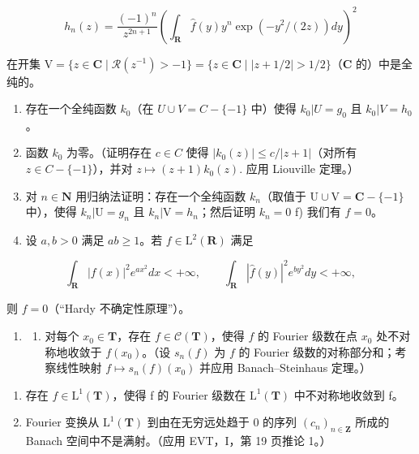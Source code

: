 \[
h _ {n} (z) = \frac {(- 1) ^ {n}}{z ^ {2 n + 1}} \left(\int_ {\mathbf {R}} \widehat {f} (y) y ^ {n} \exp (- y ^ {2} / (2 z)) d y\right) ^ {2}
\]

在开集 \(\mathrm{V} = \{z \in \mathbf{C} \mid \mathcal{R}(z^{-1}) > -1\} = \{z \in \mathbf{C} \mid |z + 1/2| > 1/2\}\)（\(\mathbf{C}\) 的）中是全纯的。

\begin{enumerate}
\def\labelenumi{\alph{enumi})}
\setcounter{enumi}{2}
\item
存在一个全纯函数 \(k_{0}\)（在 \(U \cup V = C - \{-1\}\) 中）使得 \(k_{0}|U = g_{0}\) 且 \(k_{0}|V = h_{0}\)。
\item
  函数 \(k_{0}\) 为零。（证明存在 \(c \in C\) 使得 \(|k_{0}(z)| \leqslant c/|z+1|\)（对所有 \(z \in C - \{-1\}\)），并对 \(z \mapsto (z+1)k_{0}(z).\) 应用 Liouville 定理。）
\item
    对 \(n \in \mathbf{N}\) 用归纳法证明：存在一个全纯函数 \(k_n\)（取值于 \(\mathrm{U} \cup \mathrm{V} = \mathbf{C} - \{-1\}\) 中），使得 \(k_n | \mathrm{U} = g_n\) 且 \(k_n | \mathrm{V} = h_n\)；然后证明 \(k_n = 0\) f) 我们有 \(f = 0\)。
\item
  设 \(a, b > 0\) 满足 \(ab \geqslant 1\)。若 \(f \in \mathrm{L}^2(\mathbf{R})\) 满足
\end{enumerate}

\[
\int_ {\mathbf {R}} | f (x) | ^ {2} e ^ {a x ^ {2}} d x <   + \infty , \qquad \int_ {\mathbf {R}} | \widehat {f} (y) | ^ {2} e ^ {b y ^ {2}} d y <   + \infty ,
\]

则 \(f = 0\)（“Hardy 不确定性原理”）。

\begin{enumerate}
\def\labelenumi{\arabic{enumi})}
\setcounter{enumi}{29}
\tightlist
\item
  \begin{enumerate}
  \def\labelenumii{\alph{enumii})}
  \tightlist
  \item
    对每个 \(x_0 \in \mathbf{T}\)，存在 \(f \in \mathcal{C}(\mathbf{T})\)，使得 \(f\) 的 Fourier 级数在点 \(x_0\) 处不对称地收敛于 \(f(x_0)\)。（设 \(s_n(f)\) 为 \(f\) 的 Fourier 级数的对称部分和；考察线性映射 \(f \mapsto s_n(f)(x_0)\) 并应用 Banach–Steinhaus 定理。）
  \end{enumerate}
\end{enumerate}

\begin{enumerate}
\def\labelenumi{\alph{enumi})}
\setcounter{enumi}{1}
\item
  存在 \(f \in \mathrm{L}^{1}(\mathbf{T})\)，使得 f 的 Fourier 级数在 \(\mathrm{L}^{1}(\mathbf{T})\) 中不对称地收敛到 f。
\item
  Fourier 变换从 \(\mathrm{L}^{1}(\mathbf{T})\) 到由在无穷远处趋于 0 的序列 \((c_{n})_{n\in\mathbf{Z}}\) 所成的 Banach 空间中不是满射。（应用 EVT，I，第 19 页推论 1。）
\end{enumerate}

